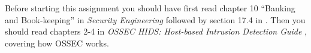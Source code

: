 Before starting this assignment you should have first read chapter 10 ``Banking 
and Book-keeping'' in \emph{Security Engineering} \cite{Anderson2008sea} 
followed by section 17.4 in  \cite{Gollmann2011cs}.
Then you should read chapters 2-4 in \emph{OSSEC HIDS: Host-based Intrusion 
Detection Guide} \cite{ossec2,ossec3,ossec4}, covering how OSSEC works.
